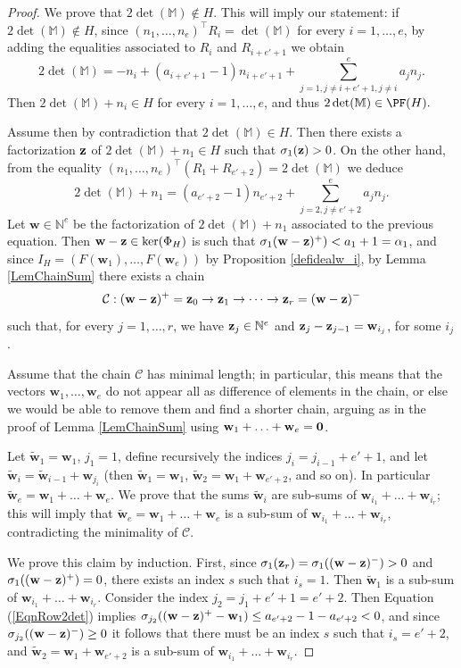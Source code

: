 \documentclass[11pt,twoside]{amsart}
\newcommand{\N}{\mathbb N}
\newcommand{\MM}{\mathbb M}
\newcommand{\cC}{\mathcal{C}}
\def\bw{{\mathbf w}}
\def\bbM{{\mathbb M}}
\theoremstyle{definition}
\numberwithin{equation}{section}
\begin{document}
\begin{proof}
We prove that $2\det(\bbM) \notin H$. This will imply our statement: if $2\det(\bbM) \notin H$, since $(n_1, \ldots , n_e)^\intercal R_i = \det(\bbM)$ for every $i=1,\ldots,e$, by adding the equalities associated to $R_i$ and $R_{i+e'+1}$ we obtain
$$2\det(\bbM)= -n_i+(a_{i+e'+1}-1)n_{i+e'+1}+\sum_{j=1,j \ne i+e'+1, j \ne i}^e a_jn_j.$$
Then $2\det(\MM)+n_i \in H$ for every $i=1,\ldots,e$, and thus $2\det(\MM) \in \PF(H).$

Assume then by contradiction that $2\det(\bbM) \in H$. Then there exists a factorization ${\bf z}$ of $2\det(\bbM)+n_1 \in H$ such that $\sigma_1({\bf z}) > 0$. On the other hand, from the equality $(n_1, \ldots , n_e)^\intercal (R_1+R_{e'+2})= 2\det(\bbM)$ we deduce 
\begin{equation}\label{EqnRow2det}
2\det(\bbM)+n_1= (a_{e'+2}-1)n_{e'+2}+\sum_{j=2,j \ne e'+2}^e a_jn_j.
\end{equation}
Let $\bw \in \N^e$ be the factorization of $2\det(\MM)+n_1$ associated to the previous equation. Then $\bw-{\bf z} \in \ker(\Phi_H)$ is such that $\sigma_1(\bw-{\bf z})^+) < a_1+1 = \alpha_1$, and since $I_H=(F(\bw_1),\ldots,F(\bw_e))$ by Proposition \ref{defidealw_i}, by Lemma \ref{LemChainSum} there exists a chain
$$\cC : (\bw-{\bf z})^+ = {\bf z}_{0} \rightarrow {\bf z}_{1} \rightarrow \cdots \rightarrow {\bf z}_{r} = (\bw-{\bf z})^-$$
such that, for every $j=1,\ldots,r$, we have ${\bf z}_{j} \in \N^e$ and ${\bf z}_{j} - {\bf z}_{j-1}=  \bw_{i_j}$, for some $i_j$.

Assume that the chain $\cC$ has minimal length; 
in particular, this means that the vectors $\bw_1,\ldots,\bw_e$ do not appear all as difference of elements in the chain, 
or else we would be able to remove them and find a shorter chain, 
arguing as in the proof of Lemma \ref{LemChainSum} using $\bw_1+\ldots+\bw_e={\bf 0}$. 

Let $\tilde{\bw}_1=\bw_1$, $j_1=1$, define recursively the indices $j_i = j_{i-1}+e'+1$, and let $\tilde{\bw}_i = \tilde{\bw}_{i-1} + \bw_{j_i}$ (then $\tilde{\bw}_1=\bw_1$, $\tilde{\bw}_2=\bw_1+\bw_{e'+2}$, and so on). In particular $\tilde{\bw}_e = \bw_1+\ldots+\bw_e$. We prove that the sums $\tilde{\bw}_i$ are sub-sums of $\bw_{i_1}+\ldots+\bw_{i_r}$; this will imply that $\tilde{\bw}_e = \bw_1+\ldots+\bw_e$ is a sub-sum of $\bw_{i_1}+\ldots+\bw_{i_r}$, contradicting the minimality of $\cC$.

We prove this claim by induction. First, since $\sigma_1({\bf z}_r) = \sigma_1((\bw-{\bf z})^-) > 0$ and $\sigma_1((\bw-{\bf z})^+) = 0$, there exists an index $s$ such that $i_s=1$. 
Then $\tilde{\bw}_1$ is a sub-sum of $\bw_{i_1}+\ldots+\bw_{i_r}$. 
Consider the index $j_2=j_1+e'+1=e'+2$. Then Equation (\ref{EqnRow2det}) implies $\sigma_{j_2}((\bw- {\bf z})^+-\bw_1) \le a_{e'+2}-1 - a_{e'+2} < 0$, and since $\sigma_{j_2}((\bw-{\bf z})^-) \ge 0$
it follows that there must be an index $s$ such that $i_s=e'+2$, and $\tilde{\bw}_2=\bw_1+\bw_{e'+2}$ is a sub-sum of $\bw_{i_1}+\ldots+\bw_{i_r}$.


\end{proof}
\end{document}
